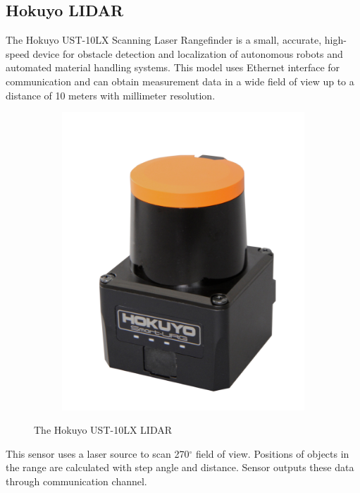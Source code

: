 \documentclass[times, utf8, diplomski, english]{fer}
\begin{document}
\subsection{Hokuyo LIDAR}
The Hokuyo UST-10LX Scanning Laser Rangefinder is a small, accurate, high-speed device for obstacle detection and localization of autonomous robots and automated material handling systems. 
This model uses Ethernet interface for communication and can obtain measurement data in a wide field of view up to a distance of 10 meters with millimeter resolution.
\begin{figure}[t!]
    \centering
        \begin{subfigure}[t]{0.2\textwidth}
        \includegraphics[width=\textwidth]{hokuyo_pic}
    \end{subfigure}
    \caption{The Hokuyo UST-10LX LIDAR}\label{fig:ur10}
\end{figure}
This sensor uses a laser source to scan 270$^\circ$ field of view. Positions of objects in the range are calculated with step angle and distance. Sensor outputs these data through communication channel.
\end{document}
